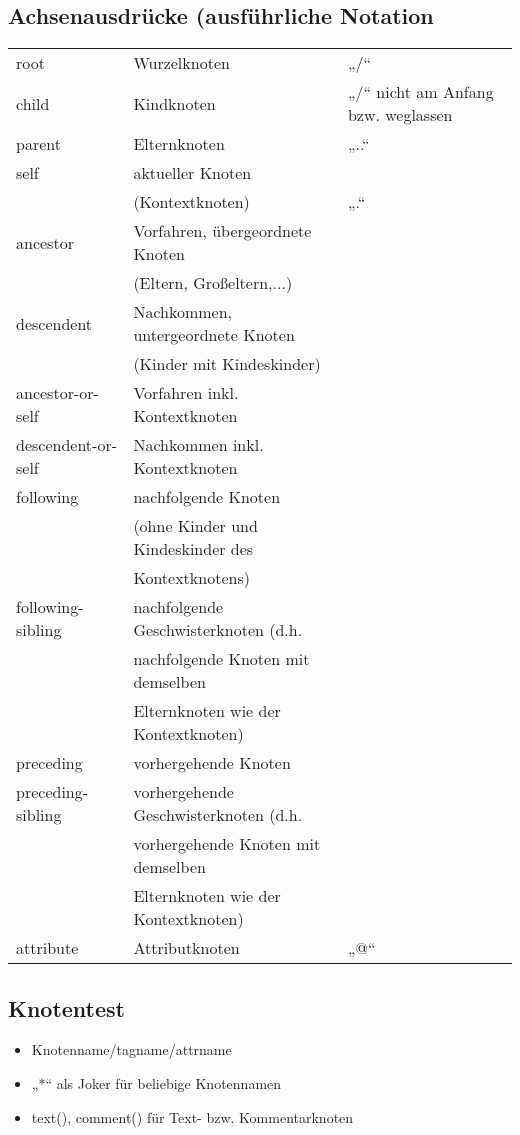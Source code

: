 \subsection{Achsenausdrücke (ausführliche Notation}
\begin{tabular}{lll}
root & Wurzelknoten & „/“\\
child & Kindknoten & „/“ {\small nicht am Anfang bzw. weglassen}\\
parent & Elternknoten & „..“\\
self & aktueller Knoten & \\
 & (Kontextknoten) & „.“\\
ancestor & Vorfahren, übergeordnete Knoten & \\
 & (Eltern, Großeltern,...)& \\
descendent & Nachkommen, untergeordnete Knoten & \\
 & (Kinder mit Kindeskinder) & \\
ancestor-or-self & Vorfahren inkl. Kontextknoten & \\
descendent-or-self & Nachkommen inkl. Kontextknoten & \\
following & nachfolgende Knoten & \\
 & (ohne Kinder und Kindeskinder des & \\
 & Kontextknotens) & \\
following-sibling & nachfolgende Geschwisterknoten (d.h. & \\
 & nachfolgende Knoten mit demselben & \\
 & Elternknoten wie der Kontextknoten) & \\
preceding & vorhergehende Knoten & \\
preceding-sibling & vorhergehende Geschwisterknoten (d.h. & \\
 & vorhergehende Knoten mit demselben & \\
 & Elternknoten wie der Kontextknoten) & \\
attribute & Attributknoten & „@“
\end{tabular}

\subsection{Knotentest}
\begin{itemize}
\item Knotenname/tagname/attrname
\item „*“ als Joker für beliebige Knotennamen
\item text(), comment() für Text- bzw. Kommentarknoten 
\end{itemize}

